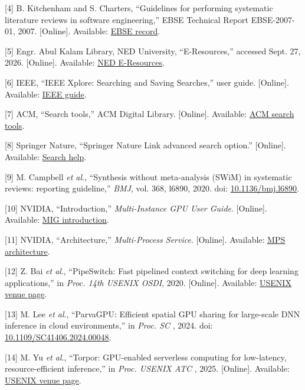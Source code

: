 \documentclass[
  12pt,
]{article}
\begin{document}
{[}4{]} B. Kitchenham and S. Charters, ``Guidelines for performing
systematic literature reviews in software engineering,'' EBSE Technical
Report EBSE-2007-01, 2007. {[}Online{]}. Available:
\href{https://ebse.webspace.durham.ac.uk/ebse-bibliography/guidelines-for-performing-systematic-literature-reviews-in-software-engineering/}{EBSE
record}.

{[}5{]} Engr. Abul Kalam Library, NED University, ``E-Resources,''
accessed Sept. 27, 2026. {[}Online{]}. Available:
\href{https://eaklibrary.neduet.edu.pk/eakl/E-Resources.html}{NED
E-Resources}.

{[}6{]} IEEE, ``IEEE Xplore: Searching and Saving Searches,'' user
guide. {[}Online{]}. Available:
\href{https://ieeexplore.ieee.org/Xplorehelp/downloads/user-guides/IEEE_Xplore_Searching_and_Saving_Searches.pdf}{IEEE
guide}.

{[}7{]} ACM, ``Search tools,'' ACM Digital Library. {[}Online{]}.
Available:
\href{https://libraries.acm.org/training-resources/search-tools}{ACM
search tools}.

{[}8{]} Springer Nature, ``Springer Nature Link advanced search
option.'' {[}Online{]}. Available:
\href{https://support.springernature.com/en/support/solutions/articles/6000080445-springer-nature-link-advanced-search-option}{Search
help}.

{[}9{]} M. Campbell \emph{et al}., ``Synthesis without meta-analysis
(SWiM) in systematic reviews: reporting guideline,'' \emph{BMJ}, vol.
368, l6890, 2020. doi:
\href{https://doi.org/10.1136/bmj.l6890}{10.1136/bmj.l6890}.

{[}10{]} NVIDIA, ``Introduction,'' \emph{Multi-Instance GPU User Guide}.
{[}Online{]}. Available:
\href{https://docs.nvidia.com/datacenter/tesla/mig-user-guide/introduction.html}{MIG
introduction}.

{[}11{]} NVIDIA, ``Architecture,'' \emph{Multi-Process Service}.
{[}Online{]}. Available:
\href{https://docs.nvidia.com/deploy/mps/architecture.html}{MPS
architecture}.

{[}12{]} Z. Bai \emph{et al}., ``PipeSwitch: Fast pipelined context
switching for deep learning applications,'' in \emph{Proc. 14th USENIX
OSDI}, 2020. {[}Online{]}. Available:
\href{https://www.usenix.org/conference/osdi20/presentation/bai}{USENIX
venue page}.

{[}13{]} M. Lee \emph{et al}., ``ParvaGPU: Efficient spatial GPU sharing
for large-scale DNN inference in cloud environments,'' in \emph{Proc. SC
}, 2024. doi:
\href{https://doi.org/10.1109/SC41406.2024.00048}{10.1109/SC41406.2024.00048}.

{[}14{]} M. Yu \emph{et al}., ``Torpor: GPU-enabled serverless computing
for low-latency, resource-efficient inference,'' in \emph{Proc. USENIX
ATC }, 2025. {[}Online{]}. Available:
\href{https://www.usenix.org/conference/atc25/presentation/yu}{USENIX
venue page}.
\end{document}
